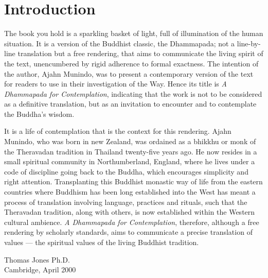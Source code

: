 
\chapter{Introduction}

The book you hold is a sparkling basket of light, full of illumination of the human situation. It is a version of the Buddhist classic, the Dhammapada; not a line-by-line translation but a free rendering, that aims to communicate the living spirit of the text, unencumbered by rigid adherence to formal exactness. The intention of the author, Ajahn Munindo, was to present a contemporary version of the text for readers to use in their investigation of the Way. Hence its title is \emph{A Dhammapada for Contemplation}, indicating that the work is not to be considered as a definitive translation, but as an invitation to encounter and to contemplate the Buddha’s wisdom.

It is a life of contemplation that is the context for this rendering. Ajahn Munindo, who was born in new Zealand, was ordained as a bhikkhu or monk of the Theravadan tradition in Thailand twenty-five years ago. He now resides in a small spiritual community in Northumberland, England, where he lives under a code of discipline going back to the Buddha, which encourages simplicity and right attention. Transplanting this Buddhist monastic way of life from the eastern countries where Buddhism has been long established into the West has meant a process of translation involving language, practices and rituals, such that the Theravadan tradition, along with others, is now established within the Western cultural ambience. \emph{A Dhammapada for Contemplation}, therefore, although a free rendering by scholarly standards, aims to communicate a precise translation of values — the spiritual values of the living Buddhist tradition.

\bigskip

{\raggedleft
Thomas Jones Ph.D.\\
Cambridge, April 2000
\par}
